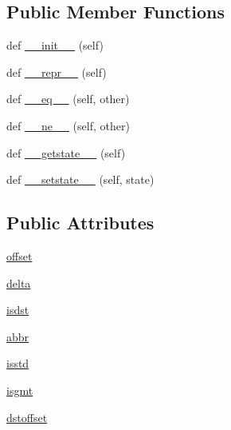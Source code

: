 \subsection*{Public Member Functions}
\begin{DoxyCompactItemize}
\item 
def \hyperlink{classdateutil_1_1tz_1_1tz_1_1__ttinfo_a25cb32365fb28d71297e6d8973830034}{\+\_\+\+\_\+init\+\_\+\+\_\+} (self)
\item 
def \hyperlink{classdateutil_1_1tz_1_1tz_1_1__ttinfo_afcd727398026db5fa3f59de87b9b1435}{\+\_\+\+\_\+repr\+\_\+\+\_\+} (self)
\item 
def \hyperlink{classdateutil_1_1tz_1_1tz_1_1__ttinfo_a53c8181ea7030259511490ef254985fa}{\+\_\+\+\_\+eq\+\_\+\+\_\+} (self, other)
\item 
def \hyperlink{classdateutil_1_1tz_1_1tz_1_1__ttinfo_a1834677819fd62c29370042f1e5e5e18}{\+\_\+\+\_\+ne\+\_\+\+\_\+} (self, other)
\item 
def \hyperlink{classdateutil_1_1tz_1_1tz_1_1__ttinfo_ac206c8bef14e682ded7b2430d76fc99e}{\+\_\+\+\_\+getstate\+\_\+\+\_\+} (self)
\item 
def \hyperlink{classdateutil_1_1tz_1_1tz_1_1__ttinfo_a1ba0c63ac79a134deb5da6331aaee71d}{\+\_\+\+\_\+setstate\+\_\+\+\_\+} (self, state)
\end{DoxyCompactItemize}
\subsection*{Public Attributes}
\begin{DoxyCompactItemize}
\item 
\hyperlink{classdateutil_1_1tz_1_1tz_1_1__ttinfo_a77dcc7994f1646124a51cc7cb011da98}{offset}
\item 
\hyperlink{classdateutil_1_1tz_1_1tz_1_1__ttinfo_a36eefc92133f407be4e9ed1e6aeb72f6}{delta}
\item 
\hyperlink{classdateutil_1_1tz_1_1tz_1_1__ttinfo_aad8ee4dd35c11a3e89f3e9e4d5b7f5bc}{isdst}
\item 
\hyperlink{classdateutil_1_1tz_1_1tz_1_1__ttinfo_a1bdf60406868210fdae16711b4ae0e65}{abbr}
\item 
\hyperlink{classdateutil_1_1tz_1_1tz_1_1__ttinfo_af3341b810054edefc9fc691877b0d809}{isstd}
\item 
\hyperlink{classdateutil_1_1tz_1_1tz_1_1__ttinfo_aa5cb6221e0b08a2f0da79d487fe5bc2b}{isgmt}
\item 
\hyperlink{classdateutil_1_1tz_1_1tz_1_1__ttinfo_a0f99b0d312e8d892c7364c3b87477cd5}{dstoffset}
\end{DoxyCompactItemize}


